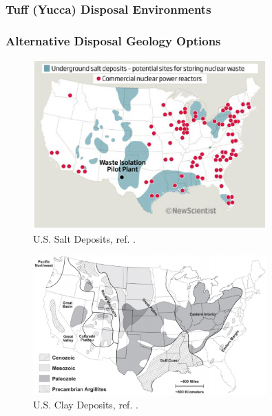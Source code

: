 

\begin{frame}[ctb!]
  \frametitle{Tuff (Yucca) Disposal Environments}
  \footnotesize{
    
  }
\end{frame}

\begin{frame}[ctb!]
  \frametitle{Alternative Disposal Geology Options}
   \begin{minipage}{0.44\textwidth}
     \begin{figure}[h!]
         \includegraphics[width=0.8\textwidth]{saltNewScientist.eps}
         \caption{U.S. Salt Deposits, ref. \cite{newscientist_where_2011}.}
     \end{figure}
     \begin{figure}[h!]
         \includegraphics[width=0.8\textwidth]{clayGonzales.eps}
         \caption{U.S. Clay Deposits, ref. \cite{gonzales_shales_1985}.}
     \end{figure}
   \end{minipage}
   \hspace{0.01cm}
   \begin{minipage}{0.44\textwidth}
     \begin{figure}[h!]

\end{figure}
\end{minipage}
\end{frame}
